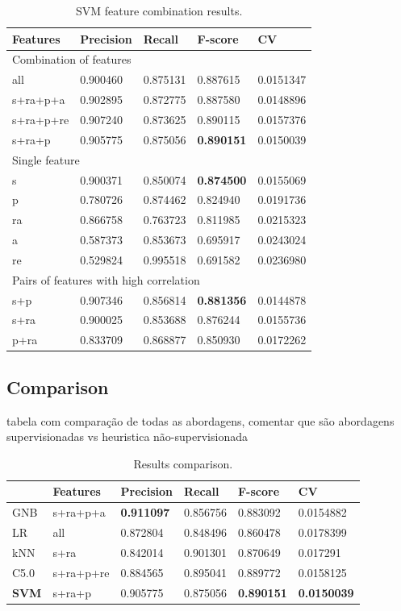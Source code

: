 \begin{table}[h]
\centering
\caption{SVM feature combination results.}
\label{tab:svmfeatcombres}
\begin{tabular}{ | l | l | l | l | l |}
\hline
Features & Precision & Recall & F-score & CV \\
\hline
\multicolumn{5}{|l|}{Combination of features} \\
\hline
all      & 0.900460 & 0.875131 & 0.887615 & 0.0151347 \\
s+ra+p+a & 0.902895 & 0.872775 & 0.887580 & 0.0148896 \\
s+ra+p+re& 0.907240 & 0.873625 & 0.890115 & 0.0157376 \\
s+ra+p   & 0.905775 & 0.875056 & \textbf{0.890151} & 0.0150039 \\
\hline
\multicolumn{5}{|l|}{Single feature} \\
\hline
s        & 0.900371 & 0.850074 & \textbf{0.874500} & 0.0155069 \\
p        & 0.780726 & 0.874462 & 0.824940 & 0.0191736 \\
ra       & 0.866758 & 0.763723 & 0.811985 & 0.0215323 \\
a        & 0.587373 & 0.853673 & 0.695917 & 0.0243024 \\
re       & 0.529824 & 0.995518 & 0.691582 & 0.0236980 \\
\hline
\multicolumn{5}{|l|}{Pairs of features with high correlation} \\
s+p      & 0.907346 & 0.856814 & \textbf{0.881356} & 0.0144878 \\
s+ra     & 0.900025 & 0.853688 & 0.876244 & 0.0155736 \\
p+ra     & 0.833709 & 0.868877 & 0.850930 & 0.0172262 \\
\hline
\end{tabular}
\end{table}

\subsection{Comparison}
tabela com comparação de todas as abordagens, comentar que são abordagens
supervisionadas vs heuristica não-supervisionada


\begin{table}[h]
\centering
\caption{Results comparison.}
\label{tab:results}
\begin{tabular}{ | l | l | l | l | l | l |}
\hline
& Features & Precision & Recall & F-score & CV \\
\hline
GNB  & s+ra+p+a & \textbf{0.911097} & 0.856756 & 0.883092 & 0.0154882 \\
LR   & all      & 0.872804 & 0.848496 & 0.860478 & 0.0178399 \\
kNN  & s+ra     & 0.842014 & 0.901301 & 0.870649 & 0.017291 \\
C5.0 & s+ra+p+re& 0.884565 & 0.895041 & 0.889772 & 0.0158125 \\
\textbf{SVM} & s+ra+p   & 0.905775 & 0.875056 & \textbf{0.890151} & \textbf{0.0150039} \\
\hline
\end{tabular}
\end{table}

